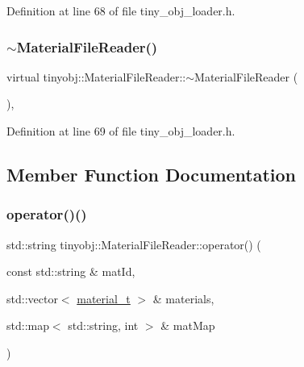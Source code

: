 Definition at line 68 of file tiny\+\_\+obj\+\_\+loader.\+h.

\mbox{\label{classtinyobj_1_1_material_file_reader_a0a00d236393f9972b676a2fb6fe2b819}} 
\subsubsection{\texorpdfstring{$\sim$\+Material\+File\+Reader()}{~MaterialFileReader()}}
{\footnotesize\ttfamily virtual tinyobj\+::\+Material\+File\+Reader\+::$\sim$\+Material\+File\+Reader (\begin{DoxyParamCaption}{ }\end{DoxyParamCaption})\hspace{0.3cm}{\ttfamily [inline]}, {\ttfamily [virtual]}}



Definition at line 69 of file tiny\+\_\+obj\+\_\+loader.\+h.



\subsection{Member Function Documentation}
\mbox{\label{classtinyobj_1_1_material_file_reader_a9374212c9997aa8ac0d15d97f67b25f8}} 
\subsubsection{\texorpdfstring{operator()()}{operator()()}}
{\footnotesize\ttfamily std\+::string tinyobj\+::\+Material\+File\+Reader\+::operator() (\begin{DoxyParamCaption}\item[{const std\+::string \&}]{mat\+Id,  }\item[{std\+::vector$<$ \hyperlink{structtinyobj_1_1material__t}{material\+\_\+t} $>$ \&}]{materials,  }\item[{std\+::map$<$ std\+::string, int $>$ \&}]{mat\+Map }\end{DoxyParamCaption})\hspace{0.3cm}{\ttfamily [virtual]}}



